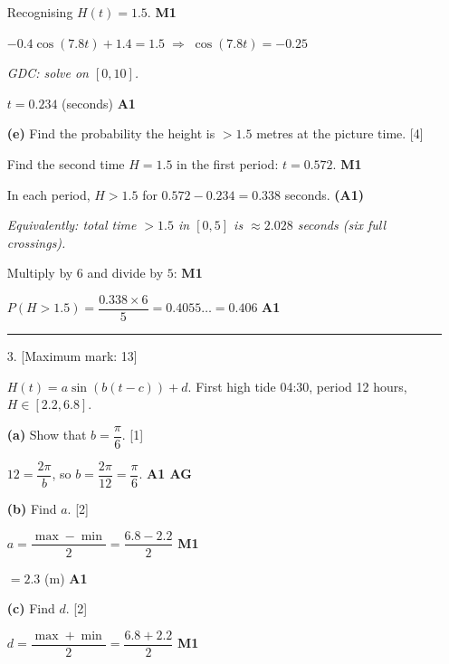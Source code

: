 \documentclass[12pt, twoside]{article}
\begin{document}
\begin{enumerate}[itemsep=0.3cm]
\medskip

Recognising $H(t) = 1.5$. \hfill \textbf{M1}

$-0.4 \cos(7.8 t) + 1.4 = 1.5 \;\Rightarrow\; \cos(7.8 t) = -0.25$

\textit{GDC: solve on $[0, 10]$.}

$t = 0.234$ (seconds) \hfill \textbf{A1}

\medskip

\textbf{(e)} Find the probability the height is $> 1.5$ metres at the picture time. \hfill [4]

\medskip

Find the second time $H = 1.5$ in the first period: $t = 0.572$. \hfill \textbf{M1}

In each period, $H > 1.5$ for $0.572 - 0.234 = 0.338$ seconds. \hfill \textbf{(A1)}

\textit{Equivalently: total time $> 1.5$ in $[0, 5]$ is $\approx 2.028$ seconds (six full crossings).}

Multiply by $6$ and divide by $5$: \hfill \textbf{M1}

$P(H > 1.5) = \dfrac{0.338 \times 6}{5} = 0.4055\ldots = 0.406$ \hfill \textbf{A1}

\bigskip
\hrule
\bigskip

\newpage

\item[3.] [Maximum mark: 13]

$H(t) = a\sin(b(t-c)) + d$. First high tide 04:30, period 12 hours, $H \in [2.2, 6.8]$.

\medskip

\textbf{(a)} Show that $b = \dfrac{\pi}{6}$. \hfill [1]

\medskip

$12 = \dfrac{2\pi}{b}$, so $b = \dfrac{2\pi}{12} = \dfrac{\pi}{6}$. \hfill \textbf{A1 AG}

\medskip

\textbf{(b)} Find $a$. \hfill [2]

\medskip

$a = \dfrac{\max - \min}{2} = \dfrac{6.8 - 2.2}{2}$ \hfill \textbf{M1}

$= 2.3$ (m) \hfill \textbf{A1}

\medskip

\textbf{(c)} Find $d$. \hfill [2]

\medskip

$d = \dfrac{\max + \min}{2} = \dfrac{6.8 + 2.2}{2}$ \hfill \textbf{M1}


\end{enumerate}
\end{document}
